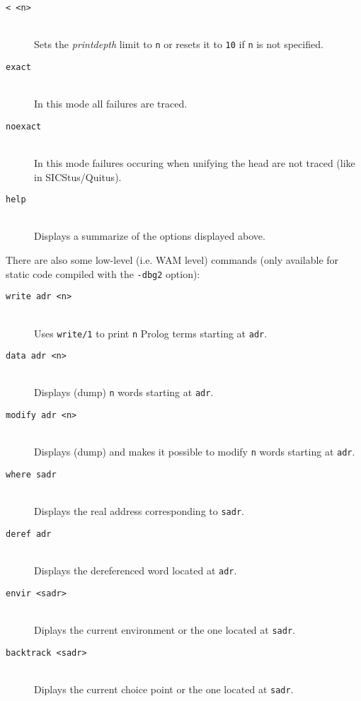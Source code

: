\begin{description}
\item [{\tt < <n>}]~\\
	Sets the {\em printdepth} limit to {\tt n} or resets it to
	{\tt 10} if {\tt n} is not specified.

\item [{\tt exact}]~\\
	In this mode all failures are traced.

\item [{\tt noexact}]~\\
	In this mode failures occuring when unifying the head are not
	traced (like in SICStus/Quitus).

\item [{\tt help}]~\\
	Displays a summarize of the options displayed above.

\end{description}

There are also some low-level (i.e. WAM level) commands (only
available for static code compiled with the {\tt -dbg2} option):

\begin{description}

\item [{\tt write adr <n>}]~\\
	Uses {\tt write/1} to print {\tt n} Prolog terms starting at
	{\tt adr}.

\item [{\tt data adr <n>}]~\\
	Displays (dump) {\tt n} words starting at {\tt adr}.

\item [{\tt modify adr <n>}]~\\
	Displays (dump) and makes it possible to modify {\tt n} words
	starting at {\tt adr}.

\item [{\tt where sadr}]~\\
	Displays the real address corresponding to {\tt sadr}.

\item [{\tt deref adr}]~\\
	Displays the dereferenced word located at {\tt adr}.

\item [{\tt envir <sadr>}]~\\
	Diplays the current environment or the one located at {\tt sadr}.

\item [{\tt backtrack <sadr>}]~\\
	Diplays the current choice point or the one located at {\tt sadr}.

\end{description}

